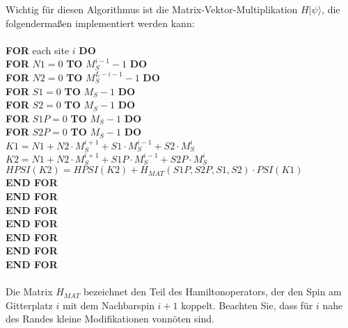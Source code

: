 \documentclass[german,10pt,a4paper]{newexam}
\begin{document}
Wichtig f{\"u}r diesen Algorithmus ist die Matrix-Vektor-Multiplikation $H|\psi\rangle$, die folgenderma{\ss}en implementiert werden kann:\\\\
\textbf{FOR} each site $i$ \textbf{DO}\\
\hspace*{1em}\textbf{FOR} $N1=0$ \textbf{TO} $M_{S}^{i-1}-1$ \textbf{DO}\\
\hspace*{2em}\textbf{FOR} $N2=0$ \textbf{TO} $M_{S}^{L-i-1}-1$ \textbf{DO}\\
\hspace*{3em}\textbf{FOR} $S1=0$ \textbf{TO} $M_S-1$ \textbf{DO}\\
\hspace*{4em}\textbf{FOR} $S2=0$ \textbf{TO} $M_S-1$ \textbf{DO}\\
\hspace*{5em}\textbf{FOR} $S1P=0$ \textbf{TO} $M_S-1$ \textbf{DO}\\
\hspace*{6em}\textbf{FOR} $S2P=0$ \textbf{TO} $M_S-1$ \textbf{DO}\\
\hspace*{7em}$K1=N1+N2\cdot M_{S}^{i+1}+S1\cdot M_{S}^{i-1}+S2\cdot M_{S}^{i}$\\
\hspace*{7em}$K2=N1+N2\cdot M_{S}^{i+1}+S1P\cdot M_{S}^{i-1}+S2P\cdot M_{S}^{i}$\\
\hspace*{7em}$HPSI(K2)=HPSI(K2)+H_{MAT}(S1P,S2P,S1,S2)\cdot PSI(K1)$\\
\hspace*{6em}\textbf{END FOR}\\
\hspace*{5em}\textbf{END FOR}\\
\hspace*{4em}\textbf{END FOR}\\
\hspace*{3em}\textbf{END FOR}\\
\hspace*{2em}\textbf{END FOR}\\
\hspace*{1em}\textbf{END FOR}\\
\textbf{END FOR}\\\\
Die Matrix $H_{MAT}$ bezeichnet den Teil des Hamiltonoperators, der den Spin am Gitterplatz $i$ mit dem Nachbarspin $i+1$ koppelt.
Beachten Sie, dass f{\"u}r $i$ nahe des Randes kleine Modifikationen vonn{\"o}ten sind.
\end{document}
